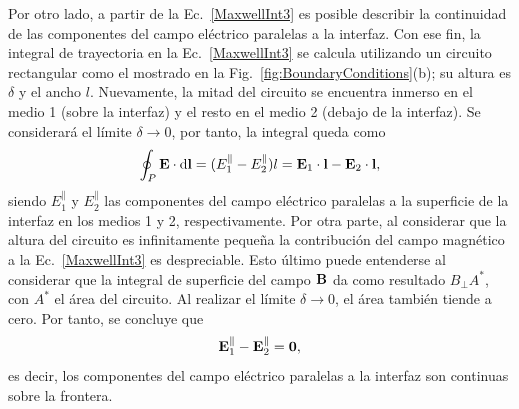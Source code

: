 Por otro lado, a partir de la Ec.~\eqref{MaxwellInt3} es posible describir la continuidad de las componentes del campo eléctrico paralelas a la interfaz. Con ese fin, la integral de trayectoria en la Ec.~\eqref{MaxwellInt3} se calcula utilizando un circuito rectangular como el mostrado en la Fig.~\ref{fig:BoundaryConditions}(b); su altura  es $\delta$ y el ancho $l$. Nuevamente, la mitad del circuito se encuentra inmerso en el medio 1 (sobre la interfaz) y el resto en el medio 2 (debajo de la interfaz). Se considerará el límite $\delta\to0$, por tanto, la integral queda como
\begin{equation}
\oint_{P}\vb{E}\cdot\dd{\vb{l}}=(E_{1}^{\parallel}-E_{2}^{\parallel})l=\vb{E}_{1}\cdot\vb{l}-\vb{E}_{2}\cdot\vb{l},
\end{equation}
siendo $E_{1}^{\parallel}$ y $E_{2}^{\parallel}$ las componentes del campo eléctrico paralelas a la superficie de la interfaz en los medios 1 y 2, respectivamente. Por otra parte, al considerar que la altura del circuito es infinitamente pequeña la contribución del campo magnético a la Ec.~\eqref{MaxwellInt3} es despreciable. Esto último puede entenderse al considerar que la integral de superficie del campo $\vb{B}$ da como resultado $B_{\perp}A^{*}$, con $A^{*}$ el área del circuito. Al realizar el límite $\delta\to0$, el área también tiende a cero. Por tanto, se concluye que~\cite{Griffiths}
\begin{equation}
\vb{E}^{\parallel}_{1}-\vb{E}^{\parallel}_{2}=\vb{0},
\end{equation}
es decir, los componentes del campo eléctrico paralelas a la interfaz son continuas sobre la frontera. 

